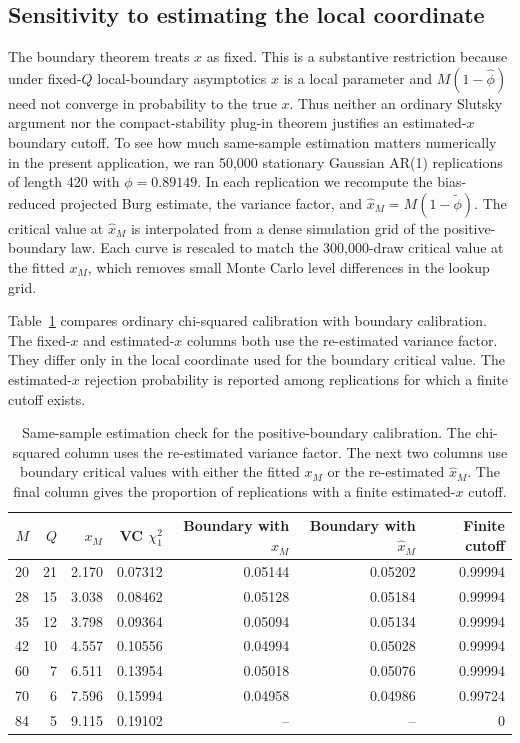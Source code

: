\documentclass[12pt]{article}
\theoremstyle{remark}
\begin{document}
\subsection{Sensitivity to estimating the local coordinate}
The boundary theorem treats $x$ as fixed. This is a substantive restriction because under fixed-$Q$ local-boundary asymptotics $x$ is a local parameter and $M(1-\widehat\phi)$ need not converge in probability to the true $x$. Thus neither an ordinary Slutsky argument nor the compact-stability plug-in theorem justifies an estimated-$x$ boundary cutoff. To see how much same-sample estimation matters numerically in the present application, we ran 50,000 stationary Gaussian AR(1) replications of length 420 with $\phi=0.89149$. In each replication we recompute the bias-reduced projected Burg estimate, the variance factor, and $\widehat x_M=M(1-\widetilde\phi)$. The critical value at $\widehat x_M$ is interpolated from a dense simulation grid of the positive-boundary law. Each curve is rescaled to match the 300,000-draw critical value at the fitted $x_M$, which removes small Monte Carlo level differences in the lookup grid.

Table~\ref{tab:supp-vix-x-plugin} compares ordinary chi-squared calibration with boundary calibration. The fixed-$x$ and estimated-$x$ columns both use the re-estimated variance factor. They differ only in the local coordinate used for the boundary critical value. The estimated-$x$ rejection probability is reported among replications for which a finite cutoff exists.

\begin{table}[H]
\centering
\caption{Same-sample estimation check for the positive-boundary calibration. The chi-squared column uses the re-estimated variance factor. The next two columns use boundary critical values with either the fitted $x_M$ or the re-estimated $\widehat x_M$. The final column gives the proportion of replications with a finite estimated-$x$ cutoff.}
\label{tab:supp-vix-x-plugin}
\small
\setlength{\tabcolsep}{4pt}
\begin{tabular}{rrrrrrr}
\toprule
$M$ & $Q$ & $x_M$ & VC $\chi_1^2$ & Boundary with $x_M$ & Boundary with $\widehat x_M$ & Finite cutoff \\
\midrule
20 & 21 & 2.170 & 0.07312 & 0.05144 & 0.05202 & 0.99994 \\
28 & 15 & 3.038 & 0.08462 & 0.05128 & 0.05184 & 0.99994 \\
35 & 12 & 3.798 & 0.09364 & 0.05094 & 0.05134 & 0.99994 \\
42 & 10 & 4.557 & 0.10556 & 0.04994 & 0.05028 & 0.99994 \\
60 & 7  & 6.511 & 0.13954 & 0.05018 & 0.05076 & 0.99994 \\
70 & 6  & 7.596 & 0.15994 & 0.04958 & 0.04986 & 0.99724 \\
84 & 5  & 9.115 & 0.19102 & -- & -- & 0 \\
\bottomrule
\end{tabular}
\end{table}
\end{document}
